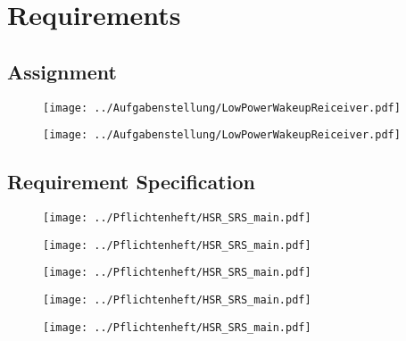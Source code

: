 \chapter{Requirements}

\newpage

\section{Assignment}
\begin{figure}[H]
	\centering
	\texttt{[image: ../Aufgabenstellung/LowPowerWakeupReiceiver.pdf]}
\end{figure}
\begin{figure}[H]
	\centering
	\texttt{[image: ../Aufgabenstellung/LowPowerWakeupReiceiver.pdf]}
\end{figure}

\newpage
\section{Requirement Specification}
\begin{figure}[H]
	\centering
	\texttt{[image: ../Pflichtenheft/HSR\_SRS\_main.pdf]}
\end{figure}
\begin{figure}[H]
	\centering
	\texttt{[image: ../Pflichtenheft/HSR\_SRS\_main.pdf]}
\end{figure}
\begin{figure}[H]
	\centering
	\texttt{[image: ../Pflichtenheft/HSR\_SRS\_main.pdf]}
\end{figure}
\begin{figure}[H]
	\centering
	\texttt{[image: ../Pflichtenheft/HSR\_SRS\_main.pdf]}
\end{figure}

\begin{landscape}
	\begin{figure}[H]
		\centering
		\texttt{[image: ../Pflichtenheft/HSR\_SRS\_main.pdf]}
	\end{figure}
\end{landscape}
